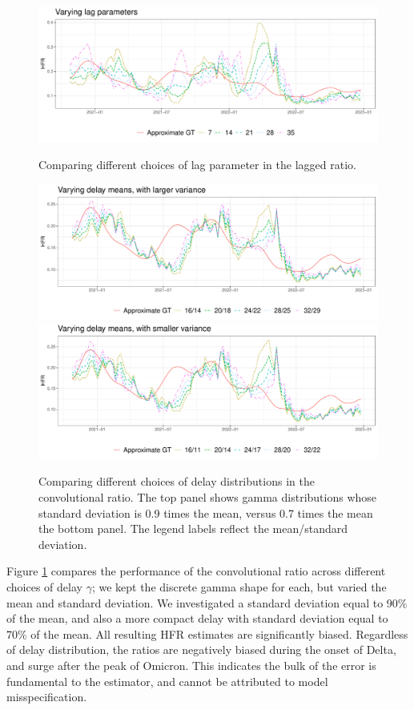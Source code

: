 \documentclass{article}
\begin{document}
\begin{figure}[p]
\centering
\includegraphics[width=\linewidth]{Figures/Real/hfrs_by_lag.pdf}
\caption{Comparing different choices of lag parameter in the lagged ratio.}
\label{fig:lag}

\bigskip
\includegraphics[width=\linewidth]{Figures/Real/hfrs_by_delay1.pdf}
\includegraphics[width=\linewidth]{Figures/Real/hfrs_by_delay2.pdf}
\caption{Comparing different choices of delay distributions in the convolutional
  ratio. The top panel shows gamma distributions whose standard deviation is 0.9
  times the mean, versus 0.7 times the mean the bottom panel. The legend labels
  reflect the mean/standard deviation.}  
\label{fig:delays}
\end{figure}

Figure \ref{fig:delays} compares the performance of the convolutional ratio
across different choices of delay $\gamma$; we kept the discrete
gamma shape for each, but varied the mean and standard deviation. We
investigated a standard deviation equal to 90\% of the mean, and also a more
compact delay with standard deviation equal to 70\% of the mean. All
resulting HFR estimates are significantly biased. Regardless of delay
distribution, the ratios are negatively biased during the onset of Delta, and
surge after the peak of Omicron. This indicates the bulk of the error is
fundamental to the estimator, and cannot be attributed to model
misspecification.     
\end{document}
